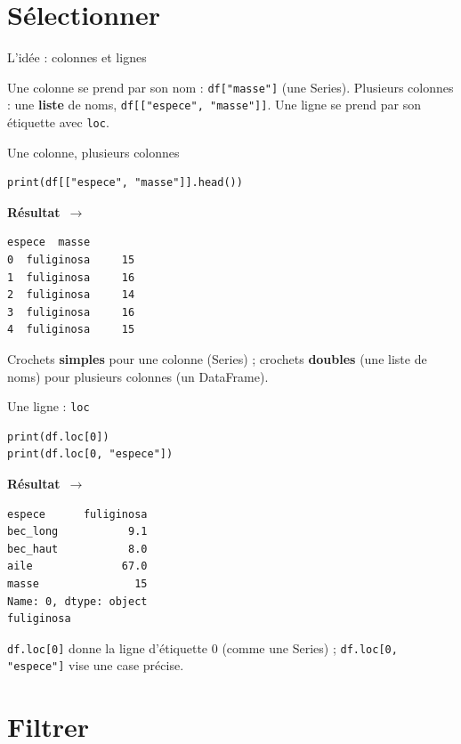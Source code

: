 \documentclass[aspectratio=169,11pt]{beamer}
\newcommand{\resultat}{{\scriptsize\textbf{R\'esultat}~$\rightarrow$}\par\vspace{1pt}}
\begin{document}
\section{Sélectionner}

\begin{frame}{L'idée : colonnes et lignes}
\begin{ucaddef}
{\small Une colonne se prend par son nom : \texttt{df["masse"]} (une Series). Plusieurs colonnes : une \textbf{liste} de noms, \texttt{df[["espece", "masse"]]}. Une ligne se prend par son étiquette avec \texttt{loc}.}
\end{ucaddef}
\end{frame}

\begin{frame}[fragile]{Une colonne, plusieurs colonnes}
\begin{lstlisting}
print(df[["espece", "masse"]].head())
\end{lstlisting}
\resultat
\begin{lstlisting}[style=out]
       espece  masse
0  fuliginosa     15
1  fuliginosa     16
2  fuliginosa     14
3  fuliginosa     16
4  fuliginosa     15
\end{lstlisting}
{\small Crochets \textbf{simples} pour une colonne (Series) ; crochets \textbf{doubles} (une liste de noms) pour plusieurs colonnes (un DataFrame).}
\end{frame}

\begin{frame}[fragile]{Une ligne : \texttt{loc}}
\begin{lstlisting}
print(df.loc[0])
print(df.loc[0, "espece"])
\end{lstlisting}
\resultat
\begin{lstlisting}[style=out]
espece      fuliginosa
bec_long           9.1
bec_haut           8.0
aile              67.0
masse               15
Name: 0, dtype: object
fuliginosa
\end{lstlisting}
{\small \texttt{df.loc[0]} donne la ligne d'étiquette 0 (comme une Series) ; \texttt{df.loc[0, "espece"]} vise une case précise.}
\end{frame}

\section{Filtrer}
\end{document}
